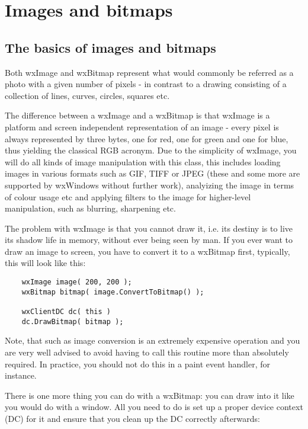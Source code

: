 \chapter{Images and bitmaps}\label{chapimages}
%
%
\setfooter{\thepage}{}{}{}{}{\thepage}%

\section{The basics of images and bitmaps}

Both wxImage and wxBitmap represent what would commonly be referred as
a photo with a given number of pixels - in contrast to a drawing consisting
of a collection of lines, curves, circles, squares etc.

The difference between a wxImage and a wxBitmap is that wxImage is a
platform and screen independent representation of an image - every
pixel is always represented by three bytes, one for red, one for green
and one for blue, thus yielding the classical RGB acronym. Due to the
simplicity of wxImage, you will do all kinds of image manipulation
with this class, this includes loading images in various formats
such as GIF, TIFF or JPEG (these and some more are supported by wxWindows 
without further work), analyizing the image in terms of colour usage etc
and applying filters to the image for higher-level manipulation, such
as blurring, sharpening etc.

The problem with wxImage is that you cannot draw it, i.e. its destiny
is to live its shadow life in memory, without ever being seen by man.
If you ever want to draw an image to screen, you have to convert it
to a wxBitmap first, typically, this will look like this:

\begin{verbatim}
    wxImage image( 200, 200 );
    wxBitmap bitmap( image.ConvertToBitmap() );
    
    wxClientDC dc( this )
    dc.DrawBitmap( bitmap );
\end{verbatim}

Note, that such as image conversion is an extremely expensive operation
and you are very well advised to avoid having to call this routine
more than absolutely required. In practice, you should not do this
in a paint event handler, for instance.

There is one more thing you can do with a wxBitmap: you can draw into
it like you would do with a window. All you need to do is set up a
proper device context (DC) for it and ensure that you clean up the
DC correctly afterwards:

